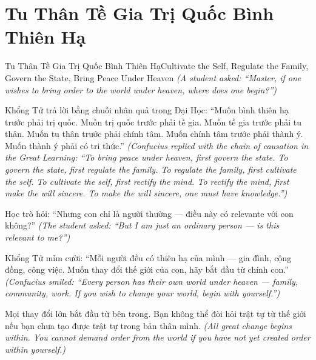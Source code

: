 \section{Tu Thân Tề Gia Trị Quốc Bình Thiên Hạ}
\begin{truyen}{Tu Thân Tề Gia Trị Quốc Bình Thiên Hạ}{Cultivate the Self, Regulate the Family, Govern the State, Bring Peace Under Heaven}
\textit{(A student asked: ``Master, if one wishes to bring order to the world under heaven, where does one begin?'')}

Khổng Tử trả lời bằng chuỗi nhân quả trong Đại Học: ``Muốn bình thiên hạ trước phải trị quốc. Muốn trị quốc trước phải tề gia. Muốn tề gia trước phải tu thân. Muốn tu thân trước phải chính tâm. Muốn chính tâm trước phải thành ý. Muốn thành ý phải có tri thức.''
\textit{(Confucius replied with the chain of causation in the Great Learning: ``To bring peace under heaven, first govern the state. To govern the state, first regulate the family. To regulate the family, first cultivate the self. To cultivate the self, first rectify the mind. To rectify the mind, first make the will sincere. To make the will sincere, one must have knowledge.'')}

Học trò hỏi: ``Nhưng con chỉ là người thường — điều này có relevante với con không?''
\textit{(The student asked: ``But I am just an ordinary person — is this relevant to me?'')}

Khổng Tử mỉm cười: ``Mỗi người đều có thiên hạ của mình — gia đình, cộng đồng, công việc. Muốn thay đổi thế giới của con, hãy bắt đầu từ chính con.''
\textit{(Confucius smiled: ``Every person has their own world under heaven — family, community, work. If you wish to change your world, begin with yourself.'')}

\end{truyen}

\begin{baihoc}
Mọi thay đổi lớn bắt đầu từ bên trong. Bạn không thể đòi hỏi trật tự từ thế giới nếu bạn chưa tạo được trật tự trong bản thân mình.
\textit{(All great change begins within. You cannot demand order from the world if you have not yet created order within yourself.)}
\end{baihoc}
\ngancach

